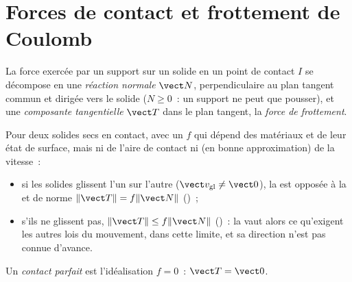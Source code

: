 \section{Forces de contact et frottement de Coulomb}

\begin{definition}\label{def:b2:rigid-body-mechanics:contact}
La force exercée par un support sur un solide en un point de contact $I$ se décompose
en une \emph{réaction normale} $\vect N$, perpendiculaire au plan
tangent commun et dirigée vers le solide ($N \ge 0$~: un support ne peut que
pousser), et une \emph{composante tangentielle} $\vect T$ dans le plan
tangent, la \emph{force de frottement}.
\end{definition}

\begin{theorem}\label{thm:b2:rigid-body-mechanics:coulomb}
Pour deux solides secs en contact, avec un \emph{} $f$
qui dépend des matériaux et de leur état de surface, mais ni de
l'aire de contact ni (en bonne approximation) de la vitesse~:
\begin{itemize}
  \item si les solides glissent l'un sur l'autre ($\vect v_{\text{gl}} \ne
        \vect 0$), la  est opposée à la 
        et de norme $\|\vect T\| = f\|\vect N\|$ ()~;
  \item s'ils ne glissent pas, $\|\vect T\| \le f\|\vect N\|$ ()~: la  vaut alors ce qu'exigent les autres lois du
        mouvement, dans cette limite, et sa direction n'est pas
        connue d'avance.
\end{itemize}
Un \emph{contact parfait} est l'idéalisation $f = 0$~: $\vect T = \vect 0$.
\end{theorem}
\admitted

